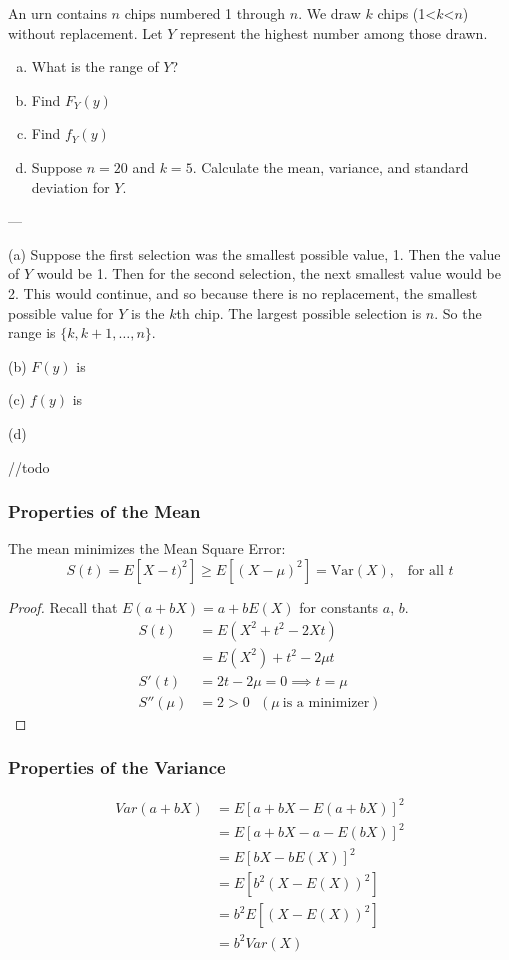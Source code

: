 \documentclass{article}
\begin{document}
An urn contains $n$ chips numbered 1 through $n$. We draw $k$ chips (1<$k$<$n$) without replacement. Let $Y$ represent the highest number among those drawn. \begin{enumerate}[(a)]
\item What is the range of $Y$?
\item Find $F_Y(y)$
\item Find $f_Y(y)$
\item Suppose $n=20$ and $k=5$. Calculate the mean, variance, and standard deviation for $Y$.
\end{enumerate}

---

(a) Suppose the first selection was the smallest possible value, 1. Then the value of $Y$ would be 1. Then for the second selection, the next smallest value would be 2. This would continue, and so because there is no replacement, the smallest possible value for $Y$ is the $k$th chip. The largest possible selection is $n$. So the range is $\boxed{\{k,k+1, \dots, n\}}$.

(b) $F(y)$ is 

(c) $f(y)$ is

(d)

//todo

\subsubsection{Properties of the Mean}

The mean minimizes the Mean Square Error: $$ S(t) = E[X-t)^2] \geq E[(X - \mu)^2] = \text{Var}(X), \ \ \ \, \text{for all } t$$

\begin{proof}
Recall that $E(a + bX) = a + bE(X)$ for constants $a$, $b$.
\begin{align*}
S(t) & = E(X^2 + t^2 - 2Xt) \\
& = E(X^2) + t^2 - 2\mu t \\
S'(t) & = 2t-2\mu = 0 \implies t = \mu \\
S''(\mu) & = 2 > 0 \ \ \ (\mu\ \text{is a minimizer})
\end{align*} \end{proof}
\subsubsection{Properties of the Variance}

\begin{align*}
Var(a + bX) & = E[a + bX - E(a + bX) ]^2 \\
& = E[a + bX -a - E(bX) ]^2 \\
& = E[bX - bE(X) ]^2 \\
& = E[b^2(X - E(X))^2 ] \\
& = b^2 E[(X - E(X))^2 ] \\
& = b^2 Var(X)
\end{align*}
\end{document}
